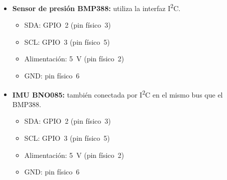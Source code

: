 \begin{itemize}
    \item \textbf{Sensor de presión BMP388:} utiliza la interfaz I\textsuperscript{2}C.
    \begin{itemize}
        \item SDA: GPIO~2 (pin físico~3)
        \item SCL: GPIO~3 (pin físico~5)
        \item Alimentación: 5~V (pin físico~2)
        \item GND: pin físico~6
    \end{itemize}

    \item \textbf{IMU BNO085:} también conectada por I\textsuperscript{2}C en el mismo bus que el BMP388.
    \begin{itemize}
        \item SDA: GPIO~2 (pin físico~3)
        \item SCL: GPIO~3 (pin físico~5)
        \item Alimentación: 5~V (pin físico~2)
        \item GND: pin físico~6
    \end{itemize}


\end{itemize}
